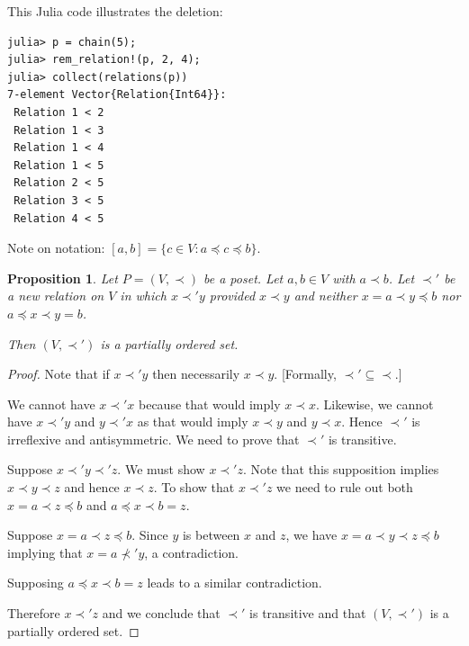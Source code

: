 \documentclass[12pt]{article}
\newtheorem{prop}{Proposition}
\begin{document}
This Julia code illustrates the deletion:
\begin{verbatim}
julia> p = chain(5);
julia> rem_relation!(p, 2, 4);
julia> collect(relations(p))
7-element Vector{Relation{Int64}}:
 Relation 1 < 2
 Relation 1 < 3
 Relation 1 < 4
 Relation 1 < 5
 Relation 2 < 5
 Relation 3 < 5
 Relation 4 < 5
\end{verbatim}

Note on notation: $[a,b] = \{ c \in V \colon a \preceq c \preceq b
\}$. 

\begin{prop}\label{prop:ab}
  Let $P=(V,\prec)$ be a poset. Let $a,b\in V$ with $a \prec b$.
  Let $\prec'$ be a new relation on $V$ in which $x\prec'y$ provided
  $x\prec y$ and neither $x=a \prec y \preceq b$ nor 
  $a\preceq x \prec y=b$.

  Then $(V,\prec')$ is a partially ordered set.
\end{prop}


\begin{proof}
  Note that if $x\prec' y$ then necessarily $x \prec y$. [Formally,
  ${\prec'} \subseteq {\prec}$.]

  We cannot have $x \prec' x$ because that would imply $x \prec
  x$. Likewise, we cannot have $x \prec' y$ and $y\prec' x$ as that
  would imply $x\prec y$ and $y\prec x$. Hence $\prec'$ is irreflexive
  and antisymmetric. We need to prove that $\prec'$ is transitive.

  Suppose $x \prec' y \prec' z$. We must show $x \prec' z$. Note that
  this supposition implies $x \prec y \prec z$ and hence $x \prec
  z$. To show that $x \prec' z$ we need to rule out both $x=a\prec
  z\preceq b$ and $a\preceq x \prec b=z$.
    
  Suppose $x=a\prec z\preceq b$. Since $y$ is between $x$ and $z$, we
  have $x=a \prec y \prec z \preceq b$ implying that $x=a\not\prec'y$,
  a contradiction.

  Supposing $a\preceq x \prec b=z$ leads to a similar contradiction.

  Therefore $x \prec' z$ and we conclude that $\prec'$ is transitive
  and that $(V,\prec')$ is a partially ordered set.
\end{proof}
\end{document}
